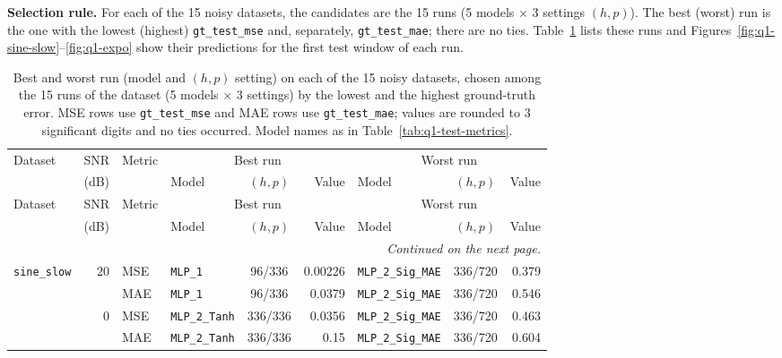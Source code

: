 \documentclass[12pt]{article}
\theoremstyle{definition}
\begin{document}
{\begin{enumerate}[label=\textbf{1.2.\arabic*}, leftmargin=*]
\textbf{Selection rule.} For each of the 15 noisy datasets, the candidates are the 15 runs (5 models $\times$ 3 settings $(h,p)$). The best (worst) run is the one with the lowest (highest) \texttt{gt\_test\_mse} and, separately, \texttt{gt\_test\_mae}; there are no ties. Table~\ref{tab:q1-best-worst} lists these runs and Figures~\ref{fig:q1-sine-slow}--\ref{fig:q1-expo} show their predictions for the first test window of each run.

{\scriptsize
\setlength{\tabcolsep}{4pt}
\setlength{\LTleft}{0pt}
\setlength{\LTright}{0pt plus 1fill}
\setlength{\LTcapwidth}{0.9\linewidth}
\begin{longtable}{@{}lrl@{\hspace{8pt}}lcr@{\hspace{8pt}}lcr@{}}
\caption{Best and worst run (model and $(h,p)$ setting) on each of the 15 noisy datasets, chosen among the 15 runs of the dataset (5 models $\times$ 3 settings) by the lowest and the highest ground-truth error. MSE rows use \texttt{gt\_test\_mse} and MAE rows use \texttt{gt\_test\_mae}; values are rounded to 3 significant digits and no ties occurred. Model names as in Table~\ref{tab:q1-test-metrics}.}\label{tab:q1-best-worst}\\
\toprule
Dataset & SNR & Metric & \multicolumn{3}{c}{Best run} & \multicolumn{3}{c}{Worst run} \\
\cmidrule(lr){4-6}\cmidrule(lr){7-9}
 & (dB) &  & Model & $(h,p)$ & Value & Model & $(h,p)$ & Value \\
\midrule
\endfirsthead
\toprule
Dataset & SNR & Metric & \multicolumn{3}{c}{Best run} & \multicolumn{3}{c}{Worst run} \\
\cmidrule(lr){4-6}\cmidrule(lr){7-9}
 & (dB) &  & Model & $(h,p)$ & Value & Model & $(h,p)$ & Value \\
\midrule
\endhead
\midrule
\multicolumn{9}{r}{\textit{Continued on the next page.}} \\
\endfoot
\bottomrule
\endlastfoot
\texttt{sine\_slow} & $20$ & MSE & \texttt{MLP\_1} & 96/336 & 0.00226 & \texttt{MLP\_2\_Sig\_MAE} & 336/720 & 0.379 \\
 &  & MAE & \texttt{MLP\_1} & 96/336 & 0.0379 & \texttt{MLP\_2\_Sig\_MAE} & 336/720 & 0.546 \\
\addlinespace[2pt]
 & $0$ & MSE & \texttt{MLP\_2\_Tanh} & 336/336 & 0.0356 & \texttt{MLP\_2\_Sig\_MAE} & 336/720 & 0.463 \\
 &  & MAE & \texttt{MLP\_2\_Tanh} & 336/336 & 0.15 & \texttt{MLP\_2\_Sig\_MAE} & 336/720 & 0.604 \\

\end{longtable}}
\end{enumerate}}
\end{document}
